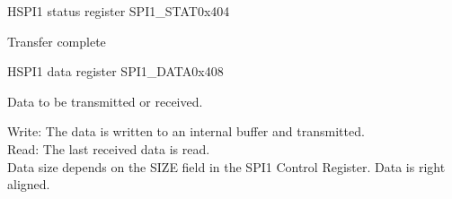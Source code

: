 \documentclass[12pt]{article}
\begin{document}
\begin{register}{H}{SPI1 status register SPI1\_STAT}{0x404}
\label{spi1stat}
%
%
\regnewline%
\end{register}
\begin{regdesc}[0.8\textwidth]\begin{reglist}[0000]
\item [TC] Transfer complete
\end{reglist}\end{regdesc}

\begin{register}{H}{SPI1 data register SPI1\_DATA}{0x408}
\label{spi1data}
\regnewline%
\end{register}
\begin{regdesc}[0.8\textwidth]\begin{reglist}[000000000]
\item [DATA] Data to be transmitted or received.
\end{reglist}\end{regdesc}
Write: The data is written to an internal buffer and transmitted.\\
Read: The last received data is read.\\
Data size depends on the SIZE field in the SPI1 Control Register. Data is right aligned.
\end{document}
